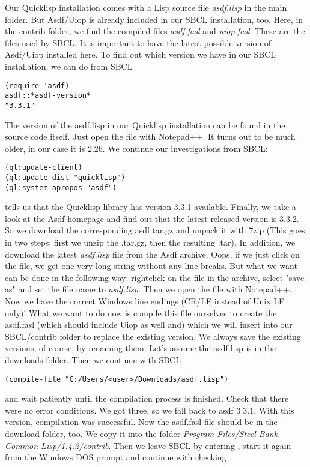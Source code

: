 \documentclass[../Maxima_Workbook.tex]{subfiles}
\begin{document}
Our Quicklisp installation comes with a Lisp source file \emph{asdf.lisp} in the main folder. But Asdf/Uiop is already included in our SBCL installation, too. Here, in the contrib folder, we find the compiled files \emph{asdf.fasl} and \emph{uiop.fasl}. These are the files used by SBCL. It is important to have the latest possible version of Asdf/Uiop installed here. To find out which version we have in our SBCL installation, we can do from SBCL

\begin{lstlisting}[style=lisp]
(require 'asdf)
asdf::*asdf-version*
"3.3.1"
\end{lstlisting}

The version of the asdf.lisp in our Quicklisp installation can be found in the source code itself. Just open the file with Notepad++. It turns out to be much older, in our case it is 2.26. We continue our investigations from SBCL:

\begin{lstlisting}[style=lisp]
(ql:update-client)
(ql:update-dist "quicklisp")
(ql:system-apropos "asdf")
\end{lstlisting}

tells us that the Quicklisp library has version 3.3.1 available. Finally, we take a look at the Asdf homepage and find out that the latest released version is 3.3.2. So we download the corresponding asdf.tar.gz and unpack it with 7zip (This goes in two steps: first we unzip the .tar.gz, then the resulting .tar). In addition, we download the latest \emph{asdf.lisp} file from the Asdf archive. Oops, if we just click on the file, we get one very long string without any line breaks. But what we want can be done in the following way: rightclick on the file in the archive, select "save as" and set the file name to \emph{asdf.lisp}. Then we open the file with Notepad++. Now we have the correct Windows line endings (CR/LF instead of Unix LF only)! What we want to do now is compile this file ourselves to create the asdf.fasl (which should include Uiop as well and) which we will insert into our SBCL/contrib folder to replace the existing version. We always save the existing versions, of course, by renaming them. Let's assume the asdf.lisp is in the downloads folder. Then we continue with SBCL

\begin{lstlisting}[style=lisp]
(compile-file "C:/Users/<user>/Downloads/asdf.lisp")
\end{lstlisting}

and wait patiently until the compilation process is finished. Check that there were no error conditions. We got three, so we fall back to asdf 3.3.1. With this version, compilation was successful. Now the asdf.fasl file should be in the download folder, too. We copy it into the folder \emph{Program Files/Steel Bank Common Lisp/1.4.2/contrib}. Then we leave SBCL by entering , start it again from the Windows DOS prompt and continue with checking
\end{document}
